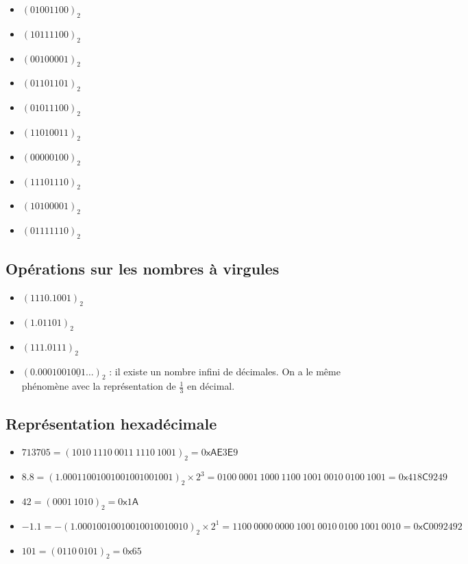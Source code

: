 \documentclass[../main.tex]{subfiles}
\begin{document}
\begin{minipage}{0.5\textwidth}
\begin{itemize}
	\item $(01001100)_{2}$
	\item $(10111100)_{2}$
	\item $(00100001)_{2}$
	\item $(01101101)_{2}$
	\item $(01011100)_{2}$
\end{itemize}
\end{minipage}
\begin{minipage}{0.5\textwidth}
\begin{itemize}
	\item $(11010011)_{2}$
	\item $(00000100)_{2}$
	\item $(11101110)_{2}$
	\item $(10100001)_{2}$
	\item $(01111110)_{2}$
\end{itemize}
\end{minipage}
\subsection{Opérations sur les nombres à virgules}
\begin{itemize}
	\item $(1110.1001)_2$
	\item $(1.01101)_2$
	\item $(111.0111)_2$
	\item $(0.0001001\underline{001}\dots)_2$ : il existe un nombre infini de décimales. On a le même phénomène avec la représentation de $\frac{1}{3}$ en décimal.
\end{itemize}
\subsection{Représentation hexadécimale}
\begin{itemize}
	\item $713705 = (1010\ 1110\ 0011\ 1110\ 1001)_{2} = 0\textsf{xAE}3\textsf{E}9$
	\item $8.8 = (1.00011001001001001001001)_{2}\times 2^{3} = 0100\ 0001\ 1000\ 1100\ 1001\ 0010\ 0100\ 1001 = 0\textsf{x}418\textsf{C}9249$
	\item $42 = (0001\ 1010)_{2} = 0\textsf{x}1\textsf{A}$
	\item $-1.1 = -(1.00010010010010010010010)_2\times{2^1} = 1100\ 0000\ 0000\ 1001\ 0010\ 0100\ 1001\ 0010 = 0\textsf{xC}0092492$
	\item $101 = (0110\ 0101)_2 = 0\textsf{x}65$
\end{itemize}
\end{document}
